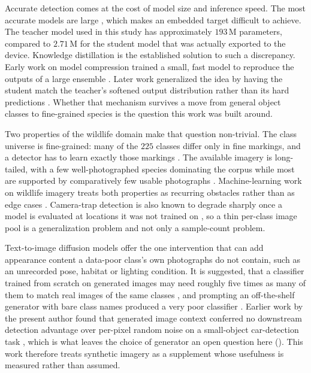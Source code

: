 Accurate detection comes at the cost of model size and inference speed. The most accurate models are large \cite{zouObjectDetection202023}, which makes an embedded target difficult to achieve. The teacher model used in this study has approximately $193\,\mathrm{M}$ parameters, compared to $2.71\,\mathrm{M}$ for the student model that was actually exported to the device. Knowledge distillation is the established solution to such a discrepancy. Early work on model compression trained a small, fast model to reproduce the outputs of a large ensemble \cite{buciluaModelCompression2006}. Later work generalized the idea by having the student match the teacher's softened output distribution rather than its hard predictions \cite{hintonDistillingKnowledgeNeural2015}. Whether that mechanism survives a move from general object classes to fine-grained species is the question this work was built around.

Two properties of the wildlife domain make that question non-trivial. The class universe is fine-grained: many of the $225$ classes differ only in fine markings, and a detector has to learn exactly those markings \cite{weiFineGrainedImageAnalysis2022}. The available imagery is long-tailed, with a few well-photographed species dominating the corpus while most are supported by comparatively few usable photographs \cite{zhangDeepLongTailedLearning2023}. Machine-learning work on wildlife imagery treats both properties as recurring obstacles rather than as edge cases \cite{tuiaPerspectivesMachineLearning2022}. Camera-trap detection is also known to degrade sharply once a model is evaluated at locations it was not trained on \cite{beeryRecognitionTerraIncognita2018}, so a thin per-class image pool is a generalization problem and not only a sample-count problem.

Text-to-image diffusion models \cite{rombachHighResolutionImageSynthesis2022} offer the one intervention that can add appearance content a data-poor class's own photographs do not contain, such as an unrecorded pose, habitat or lighting condition. It is suggested, that a classifier trained from scratch on generated images may need roughly five times as many of them to match real images of the same classes \cite{heSyntheticDataGenerative2023}, and prompting an off-the-shelf generator with bare class names produced a very poor classifier \cite{aziziSyntheticDataDiffusion2023}. Earlier work by the present author found that generated image context conferred no downstream detection advantage over per-pixel random noise on a small-object car-detection task \cite{hedrichGeneratingSyntheticDatasets2026}, which is what leaves the choice of generator an open question here (). This work therefore treats synthetic imagery as a supplement whose usefulness is measured rather than assumed.


